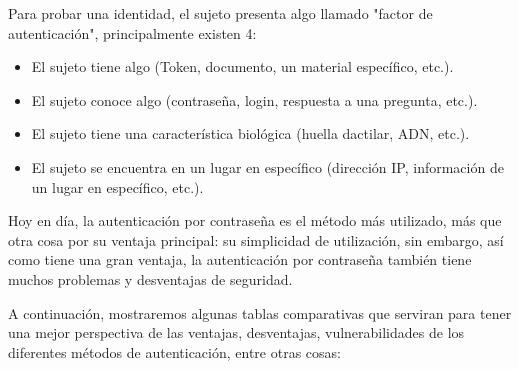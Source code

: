 \documentclass[12pt, a4paper, titlepage]{report}
\begin{document}
	    Para probar una identidad, el sujeto presenta algo llamado "factor de autenticación", principalmente existen 4: 
	    \begin{itemize}
	        \item El sujeto tiene algo (Token, documento, un material específico, etc.).
	        \item El sujeto conoce algo (contraseña, login, respuesta a una pregunta, etc.).
	        \item El sujeto tiene una característica biológica (huella dactilar, ADN, etc.).
	        \item El sujeto se encuentra en un lugar en específico (dirección IP, información de un lugar en específico, etc.).
	    \end{itemize}
	    Hoy en  día, la autenticación por contraseña es el método más utilizado, más que otra cosa por su ventaja principal: su simplicidad de utilización, sin embargo, así como tiene una gran ventaja, la autenticación por contraseña también tiene muchos problemas y desventajas de seguridad.
	    
	    A continuación, mostraremos algunas tablas comparativas que serviran para tener una mejor perspectiva de las ventajas, desventajas, vulnerabilidades de los diferentes métodos de autenticación, entre otras cosas:
		
\end{document}

